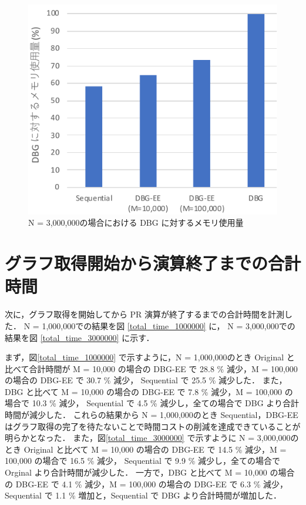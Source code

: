 \begin{figure}[t]
  \centering
  \includegraphics[width=0.8\linewidth]{./figure/memory_usage_3000000.pdf}
  \caption{N = 3,000,000の場合における DBG に対するメモリ使用量}
  \label{memory_usage_3000000}
\end{figure}

\section{グラフ取得開始から演算終了までの合計時間}
\label{total_time}
次に，グラフ取得を開始してから PR 演算が終了するまでの合計時間を計測した．
N = 1,000,000での結果を図 \ref{total_time_1000000} に，
N = 3,000,000での結果を図 \ref{total_time_3000000} に示す．

まず，図\ref{total_time_1000000} で示すように，N = 1,000,000のとき Original と比べて合計時間が M = 10,000 の場合の DBG-EE で 28.8 \% 減少，M = 100,000 の場合の DBG-EE で 30.7 \% 減少， 
Sequential で 25.5 \% 減少した．
また，DBG と比べて M = 10,000 の場合の DBG-EE で 7.8 \% 減少，M = 100,000 の場合で 10.3 \% 減少， 
Sequential で 4.5 \% 減少し，全ての場合で DBG より合計時間が減少した．
これらの結果から N = 1,000,000のとき Sequential，DBG-EE はグラフ取得の完了を待たないことで時間コストの削減を達成できていることが明らかとなった．
また，図\ref{total_time_3000000} で示すように N = 3,000,000のとき Original と比べて M = 10,000 の場合の DBG-EE で 14.5 \% 減少，M = 100,000 の場合で 16.5 \% 減少， 
Sequential で 9.9 \% 減少し，全ての場合で Orginal より合計時間が減少した．
一方で，DBG と比べて M = 10,000 の場合の DBG-EE で 4.1 \% 減少，M = 100,000 の場合の DBG-EE で 6.3 \% 減少，
Sequential で 1.1 \% 増加と，Sequential で DBG より合計時間が増加した．

